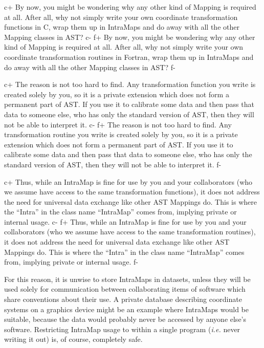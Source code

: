 \documentclass[twoside,11pt]{article}
\begin{document}
c+
By now, you might be wondering why any other kind of Mapping is
required at all. After all, why not simply write your own coordinate
transformation functions in C, wrap them up in IntraMaps and do away
with all the other Mapping classes in AST?
c-
f+
By now, you might be wondering why any other kind of Mapping is
required at all. After all, why not simply write your own coordinate
transformation routines in Fortran, wrap them up in IntraMaps and do
away with all the other Mapping classes in AST?
f-

c+
The reason is not too hard to find. Any transformation function you
write is created solely by you, so it is a private extension which
does not form a permanent part of AST. If you use it to calibrate some
data and then pass that data to someone else, who has only the
standard version of AST, then they will not be able to interpret it.
c-
f+
The reason is not too hard to find. Any transformation routine you
write is created solely by you, so it is a private extension which
does not form a permanent part of AST. If you use it to calibrate some
data and then pass that data to someone else, who has only the
standard version of AST, then they will not be able to interpret it.
f-

c+
Thus, while an IntraMap is fine for use by you and your collaborators
(who we assume have access to the same transformation functions), it
does not address the need for universal data exchange like other AST
Mappings do. This is where the ``Intra'' in the class name
``IntraMap'' comes from, implying private or internal usage.
c-
f+
Thus, while an IntraMap is fine for use by you and your collaborators
(who we assume have access to the same transformation routines), it
does not address the need for universal data exchange like other AST
Mappings do. This is where the ``Intra'' in the class name
``IntraMap'' comes from, implying private or internal usage.
f-

For this reason, it is unwise to store IntraMaps in datasets, unless
they will be used solely for communication between collaborating items
of software which share conventions about their use.  A private
database describing coordinate systems on a graphics device might be
an example where IntraMaps would be suitable, because the data would
probably never be accessed by anyone else's software. Restricting
IntraMap usage to within a single program ({\em{i.e.}} never writing
it out) is, of course, completely safe.
\end{document}
